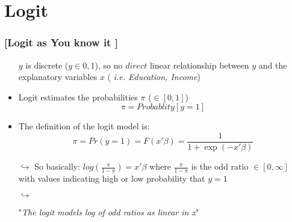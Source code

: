 \documentclass[xcolor=x11names,compress, aspectratio=169]{beamer}
\renewcommand{\(}{\begin{columns}}
\renewcommand{\)}{\end{columns}}
\newcommand{\<}[1]{\begin{column}{#1}}
\renewcommand{\>}{\end{column}}
\begin{document}
\section{Logit}

\begin{frame} %
\frametitle{\textcolor{brique}{[Logit as You know it ]}}
\pause
 \begin{itemize}[<+->]
  \item[] $y$  is discrete ($ y \in {0,1}$), so no $direct$ linear relationship between $y$ and the explanatory variables $x$ ( \textit{i.e. Education, Income})
  \item Logit estimates the probabilities $\pi$ ($\in [0,1]$)  $$\pi = Probablity[y= 1]$$
  \item The definition of the logit model is:
  $$
  \pi = Pr \left( y = 1 \right) = F( x'\beta) = \frac{1}{1+\exp(-x'\beta)}
  $$
   \item[$\hookrightarrow$] So basically:   $log(\frac{\pi}{1 - \pi}) = x'\beta$  where $\frac{\pi}{1 - \pi}$ is the odd ratio $\in [0,\infty]$  with values indicating high or low probability that $y=1$
  \item[$\hookrightarrow$] \begin{center}  "\emph{\large The logit models log of odd ratios as linear in x}" \end{center}

\end{itemize}
\end{frame}


\end{document}
